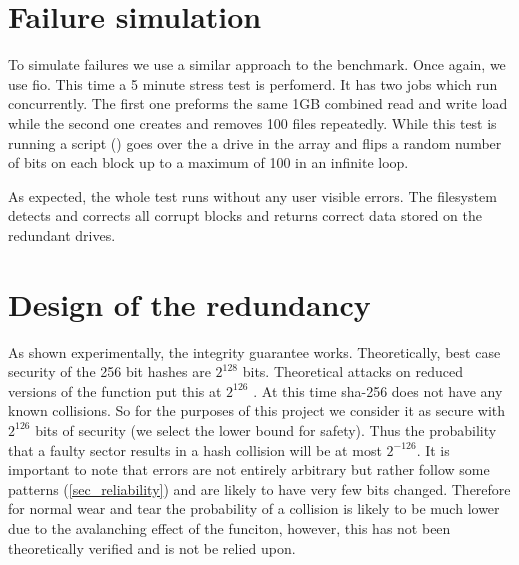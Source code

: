     \section{Failure simulation}

        To simulate failures we use a similar approach to the benchmark. Once
        again, we use fio. This time a 5 minute stress test is perfomerd. It
        has two jobs which run concurrently. The first one preforms the same
        1GB combined read and write load while the second one creates and
        removes 100 files repeatedly. While this test is running a script
        () goes over the a drive in the array
        and flips a random number of bits on each block up to a maximum of 100
        in an infinite loop.

        As expected, the whole test runs without any user visible errors. The
        filesystem detects and corrects all corrupt blocks and returns correct
        data stored on the redundant drives.


    \section{Design of the redundancy}

        As shown experimentally, the integrity guarantee works. Theoretically,
        best case security of the 256 bit hashes are $2^{128}$ bits.
        Theoretical attacks on reduced versions of the function put this at
        $2^{126}$ \cite{sha2_security} \cite{sha2_analysis}. At this time
        sha-256 does not have any known collisions. So for the purposes of this
        project we consider it as secure with $2^{126}$ bits of security (we
        select the lower bound for safety). Thus the probability that a faulty
        sector results in a hash collision will be at most $2^{-126}$. It is
        important to note that errors are not entirely arbitrary but rather
        follow some patterns (\ref{sec_reliability}) and are likely to have
        very few bits changed. Therefore for normal wear and tear the
        probability of a collision is likely to be much lower due to the
        avalanching effect of the funciton, however, this has not been
        theoretically verified and is not be relied upon.

